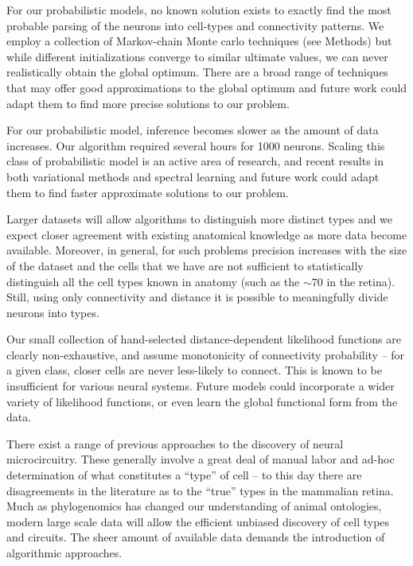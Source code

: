 \documentclass{article}
\begin{document}
For our probabilistic models, no known solution exists to
exactly find the most probable parsing of the neurons into cell-types
and connectivity patterns. We employ a collection of Markov-chain
Monte carlo techniques (see Methods) but while different
initializations converge to similar ultimate values, we can never
realistically obtain the global optimum. There are a broad range of
techniques that may offer good approximations to the global optimum
and future work could adapt them to
find more precise solutions to our problem.

For our probabilistic model, inference becomes slower as the amount of
data increases. Our algorithm required several hours for 1000
neurons. Scaling this class of probabilistic model is an active area
of research, and recent results in both variational methods
\autocite{Hoffman2013} and spectral learning \autocite{Anandkumar2012}
and future work could adapt them to find faster approximate solutions
to our problem.

Larger datasets will allow algorithms to distinguish more distinct
types and we expect closer agreement with existing anatomical
knowledge as more data become available.  Moreover, in general, for
such problems precision increases with the size of the dataset and the
cells that we have are not sufficient to statistically distinguish all
the cell types known in anatomy (such as the $\sim 70$ in the
retina). Still, using only connectivity and distance it is possible to
meaningfully divide neurons into types.

Our small collection of hand-selected distance-dependent likelihood
functions are clearly non-exhaustive, and assume monotonicity
of connectivity probability -- for a given class, closer cells
are never less-likely to connect. This is known to be insufficient
for various neural systems. Future models could incorporate
a wider variety of likelihood functions, or even learn the global
functional form from the data. 

There exist a range of previous approaches to the discovery of neural
microcircuitry\autocite{Mountcastle1957, Douglas1991, Bartho2004,
  Freund1998}.  These generally involve a great deal of manual labor
and ad-hoc determination of what constitutes a “type” of cell -- to
this day there are disagreements in the literature as to the “true”
types in the mammalian retina. Much as phylogenomics has changed our
understanding of animal ontologies, modern large scale data will allow
the efficient unbiased discovery of cell types and circuits. The sheer
amount of available data demands the introduction of algorithmic
approaches.
\end{document}
